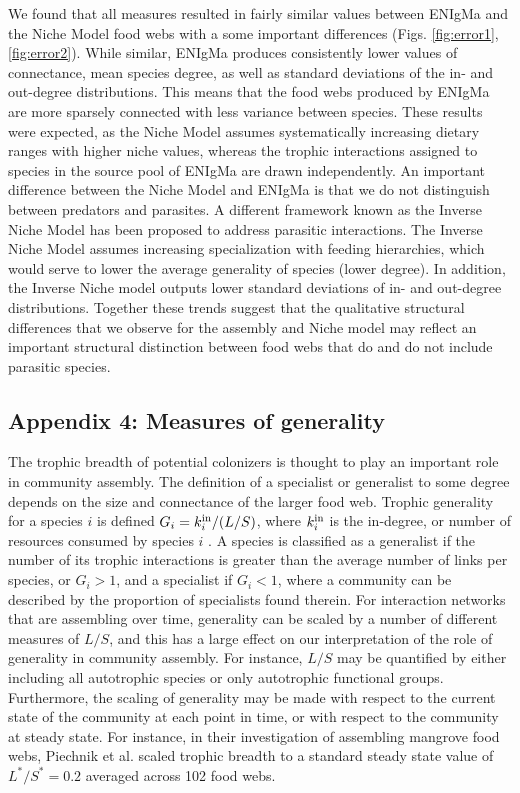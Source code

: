 \documentclass[twocolumn,preprintnumbers,amsmath,amssymb,superscriptaddress,linenumbers]{revtex4-1}
\newcommand{\rr}[1]{{\rm #1}}
\begin{document}
We found that all measures resulted in fairly similar values between ENIgMa and the Niche Model food webs with a some important differences (Figs. \ref{fig:error1},\ref{fig:error2}).
While similar, ENIgMa produces consistently lower values of connectance, mean species degree, as well as standard deviations of the in- and out-degree distributions.
This means that the food webs produced by ENIgMa are more sparsely connected with less variance between species.
These results were expected, as the Niche Model assumes systematically increasing dietary ranges with higher niche values, whereas the trophic interactions assigned to species in the source pool of ENIgMa are drawn independently.
An important difference between the Niche Model and ENIgMa is that we do not distinguish between predators and parasites.
A different framework known as the Inverse Niche Model \cite{Warren2010} has been proposed to address parasitic interactions.
The Inverse Niche Model assumes increasing specialization with feeding hierarchies, which would serve to lower the average generality of species (lower degree).
In addition, the Inverse Niche model outputs lower standard deviations of in- and out-degree distributions.
Together these trends suggest that the qualitative structural differences that we observe for the assembly and Niche model may reflect an important structural distinction between food webs that do and do not include parasitic species.


\subsection*{Appendix 4: Measures of generality}

The trophic breadth of potential colonizers is thought to play an important role in community assembly.
The definition of a specialist or generalist to some degree depends on the size and connectance of the larger food web.
Trophic generality for a species $i$ is defined $G_i = k^{\rm in}_i/(L/S)$, where $k^{\rm in}_i$ is the in-degree, or number of resources consumed by species $i$ \cite{Williams2000}.
A species is classified as a generalist if the number of its trophic interactions is greater than the average number of links per species, or $G_i > 1$, and a specialist if $G_i < 1$, where a community can be described by the proportion of specialists found therein. %
For interaction networks that are assembling over time, generality can be scaled by a number of different measures of $L/S$, and this has a large effect on our interpretation of the role of generality in community assembly.
For instance, $L/S$ may be quantified by either including all autotrophic species or only autotrophic functional groups.
Furthermore, the scaling of generality may be made with respect to the current state of the community at each point in time, or with respect to the community at steady state.
For instance, in their investigation of assembling mangrove food webs, Piechnik et al. \cite{Piechnik2008} scaled trophic breadth to a standard steady state value of $L^*/S^* = 0.2$ averaged across 102 food webs.
\end{document}

